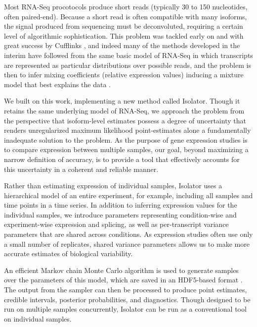 \documentclass[twocolumn]{article}
\begin{document}
Most RNA-Seq procotocols produce short reads (typically 30 to 150 nucleotides,
often paired-end). Because a short read is often compatible with many isoforms,
the signal produced from sequencing must be deconvoluted, requiring a certain
level of algorithmic sophistication. This problem was tackled early on and with
great success by Cufflinks \cite{Trapnell:2010kd}, and indeed many of the
methods developed in the interim have followed from the same basic model of
RNA-Seq in which transcripts are represented as particular distributions over
possible reads, and the problem is then to infer mixing coefficients (relative
expression values) inducing a mixture model that best explains the data
\cite{Pachter:2011wm}.

We built on this work, implementing a new method called Isolator. Though it
retains the same underlying model of RNA-Seq, we approach the problem from the
perspective that isoform-level estimates possess a degree of uncertainty that
renders unregularized maximum likelihood point-estimates alone a fundamentally
inadequate solution to the problem. As the purpose of gene expression studies is
to compare expression between multiple samples, our goal, beyond maximizing a
narrow definition of accuracy, is to provide a tool that effectively accounts
for this uncertainty in a coherent and reliable manner.

Rather than estimating expression of individual samples, Isolator uses a
hierarchical model of an entire experiment, for example, including all samples
and time points in a time series. In addition to inferring expression values for
the individual samples, we introduce parameters representing condition-wise and
experiment-wise expression and splicing, as well as per-transcript variance
parameters that are shared across conditions. As expression studies often use
only a small number of replicates, shared variance parameters allows us to make
more accurate estimates of biological variability.

An efficient Markov chain Monte Carlo algorithm is used to generate samples over
the parameters of this model, which are saved in an HDF5-based format
\cite{hdf5}. The output from the sampler can then be processed to produce point
estimates, credible intervals, posterior probabilities, and diagnostics. Though
designed to be run on multiple samples concurrently, Isolator can be run as a
conventional tool on individual samples.
\end{document}
